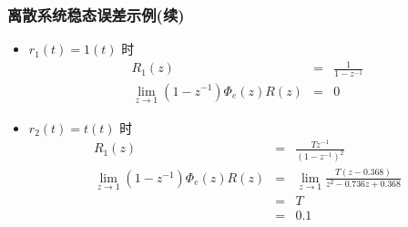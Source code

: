 \documentclass[table]{beamer}
\begin{document}
\begin{frame}
\frametitle{离散系统稳态误差示例(续)}
\label{sec-6-1-3}
\begin{itemize}

\item $r_1(t) =  1(t)$ 时\\
\label{sec-6-1-3-1}%
\begin{eqnarray*}
      R_1(z) &=& \frac{1}{1-z^{-1}} \\
      \lim_{z\rightarrow 1}(1-z^{-1})\Phi_e(z)R(z) &=& 0
      \end{eqnarray*}

\item $r_2(t) = t(t)$ 时\\
\label{sec-6-1-3-2}%
\begin{eqnarray*}
      R_1(z) &=& \frac{Tz^{-1}}{(1-z^{-1})^2} \\
      \lim_{z\rightarrow 1}(1-z^{-1})\Phi_e(z)R(z) &=& \lim_{z\rightarrow 1}\frac{T(z-0.368)}{z^2-0.736z+0.368}\\
       &=& T \\
       &=& 0.1
      \end{eqnarray*}
\end{itemize} %
\end{frame}
\end{document}
